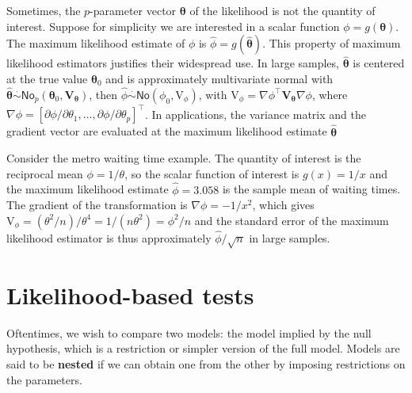 \documentclass[
  11pt,
  letterpaper,
]{book}
\theoremstyle{definition}
\theoremstyle{definition}
\theoremstyle{definition}
\theoremstyle{remark}
\begin{document}
Sometimes, the \(p\)-parameter vector \(\boldsymbol{\theta}\) of the likelihood is not the quantity of interest. Suppose for simplicity we are interested in a scalar function \(\phi = g(\boldsymbol{\theta})\). The maximum likelihood estimate of \(\phi\) is \(\widehat{\phi}=g(\widehat{\boldsymbol{\theta}})\). This property of maximum likelihood estimators justifies their widespread use. In large samples, \(\widehat{\boldsymbol{\theta}}\) is centered at the true value \(\boldsymbol{\theta}_0\) and is approximately multivariate normal with \(\widehat{\boldsymbol{\theta}} \stackrel{\cdot}{\sim} \mathsf{No}_p(\boldsymbol{\theta}_0, \mathbf{V}_{\boldsymbol{\theta}})\), then
\(\widehat{\phi} \stackrel{\cdot}{\sim}\mathsf{No}(\phi_0, \mathrm{V}_\phi)\), with \(\mathrm{V}_\phi = \nabla \phi^\top \mathbf{V}_{\boldsymbol{\theta}} \nabla \phi\), where \(\nabla \phi=[\partial \phi/\partial \theta_1, \ldots, \partial \phi/\partial \theta_p]^\top\). In applications, the variance matrix and the gradient vector are evaluated at the maximum likelihood estimate \(\widehat{\boldsymbol{\theta}}\)

Consider the metro waiting time example. The quantity of interest is the reciprocal mean \(\phi = 1/\theta\), so the scalar function of interest is \(g(x) = 1/x\) and the maximum likelihood estimate \(\hat{\phi}=3.058\) is the sample mean of waiting times. The gradient of the transformation is \(\nabla \phi = -1/x^2\), which gives \(\mathrm{V}_\phi = (\theta^2/n)/\theta^4 = 1/(n\theta^2) = \phi^2/n\) and the standard error of the maximum likelihood estimator is thus approximately \(\widehat{\phi}/\sqrt{n}\) in large samples.

\hypertarget{liktests}{%
\section{Likelihood-based tests}\label{liktests}}

Oftentimes, we wish to compare two models: the model implied by the null hypothesis, which is a restriction or simpler version of the full model. Models are said to be \textbf{nested} if we can obtain one from the other by imposing restrictions on the parameters.
\end{document}
